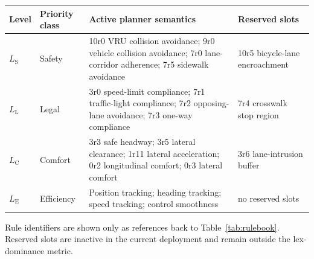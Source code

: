 
\renewcommand{\arraystretch}{1.18}
\setlength{\tabcolsep}{4pt}
\small
\centering
\begin{tabularx}{\textwidth}{>{\raggedright\arraybackslash}p{0.95cm} >{\raggedright\arraybackslash}p{1.75cm} X >{\raggedright\arraybackslash}p{3.2cm}}
  \toprule
  \rowcolor{black!5}
  \textbf{Level} & \textbf{Priority class} & \textbf{Active planner semantics} & \textbf{Reserved slots} \\
  \midrule
  \rowcolor{red!8}
  $L_{\mathrm{S}}$ & Safety &
  10r0 VRU collision avoidance; 9r0 vehicle collision avoidance; 7r0 lane-corridor adherence; 7r5 sidewalk avoidance &
  10r5 bicycle-lane encroachment \\
  \rowcolor{orange!10}
  $L_{\mathrm{L}}$ & Legal &
  3r0 speed-limit compliance; 7r1 traffic-light compliance; 7r2 opposing-lane avoidance; 7r3 one-way compliance &
  7r4 crosswalk stop region \\
  \rowcolor{green!9}
  $L_{\mathrm{C}}$ & Comfort &
  3r3 safe headway; 3r5 lateral clearance; 1r11 lateral acceleration; 0r2 longitudinal comfort; 0r3 lateral comfort &
  3r6 lane-intrusion buffer \\
  \rowcolor{blue!8}
  $L_{\mathrm{E}}$ & Efficiency &
  Position tracking; heading tracking; speed tracking; control smoothness &
  no reserved slots \\
  \bottomrule
\end{tabularx}

\vspace{2mm}
{\scriptsize\sffamily Rule identifiers are shown only as references back to Table~\ref{tab:rulebook}. Reserved slots are inactive in the current deployment and remain outside the lex-dominance metric.}
